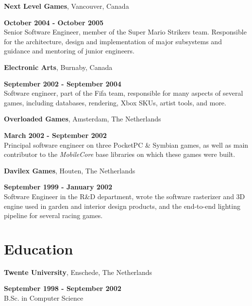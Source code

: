 \documentclass[margin,line]{resume}
\begin{document}
\begin{resume}
{\bf Next Level Games}, Vancouver, Canada

\vspace{-.3cm} \hfill {\bf October 2004 - October 2005}\\
Senior Software Engineer, member of the Super Mario Strikers team.
Responsible for the architecture, design and implementation of major
subsystems and guidance and mentoring of junior engineers.

{\bf Electronic Arts}, Burnaby, Canada

\vspace{-.3cm}
\hfill {\bf September 2002 - September 2004}\\
Software engineer, part of the Fifa team, responsible for many
aspects of several games, including databases, rendering, Xbox SKUs,
artist tools, and more.

{\bf Overloaded Games}, Amsterdam, The Netherlands

\vspace{-.3cm} \hfill {\bf March 2002 - September 2002}\\
Principal software engineer on three PocketPC \& Symbian games, as well as main contributor to the 
\emph{MobileCore} base libraries on which these games were built.

{\bf Davilex Games}, Houten, The Netherlands

\vspace{-.3cm}
\hfill {\bf September 1999 - January 2002}\\
Software Engineer in the R\&D department,
wrote the software rasterizer and 3D engine used in garden and interior design products, and the end-to-end lighting pipeline for several racing games.

\pagebreak

\section{\sc Education}
{\bf Twente University}, Enschede, The Netherlands

\vspace{-.3cm}
\hfill {\bf September 1998 - September 2002}\\
B.Sc. in Computer Science


\end{resume}
\end{document}
